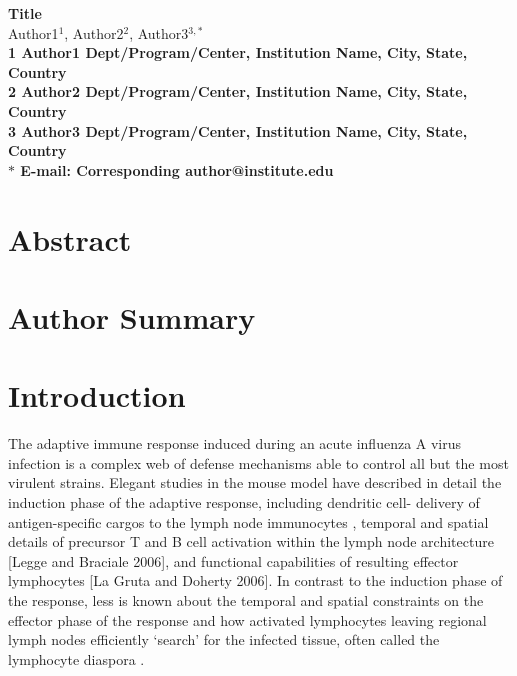 \documentclass[10pt]{article}
\date{}
\begin{document}
\begin{flushleft}
{\Large
\textbf{Title}
}
\\
Author1$^{1}$, 
Author2$^{2}$, 
Author3$^{3,\ast}$
\\
\bf{1} Author1 Dept/Program/Center, Institution Name, City, State, Country
\\
\bf{2} Author2 Dept/Program/Center, Institution Name, City, State, Country
\\
\bf{3} Author3 Dept/Program/Center, Institution Name, City, State, Country
\\
$\ast$ E-mail: Corresponding author@institute.edu
\end{flushleft}



\section*{Abstract}



\section*{Author Summary}



\section*{Introduction}

The adaptive immune response induced during an acute influenza A virus infection is a complex web of defense mechanisms able to control all but the most virulent strains.  Elegant studies in the mouse model have described in detail the induction phase of the adaptive response, including dendritic cell- delivery of antigen-specific cargos to the lymph node immunocytes \cite{Maines2008, Saenz2010, Hatta2010}, temporal and spatial details of precursor T and B cell activation within the lymph node architecture [Legge and Braciale 2006], and functional capabilities of resulting effector lymphocytes [La Gruta and Doherty 2006].  In contrast to the induction phase of the response, less is known about the temporal and spatial constraints on the effector phase of the response and how activated lymphocytes leaving regional lymph nodes efficiently ‘search’ for the infected tissue, often called the lymphocyte diaspora \cite{Marshall2001}. 
\end{document}
